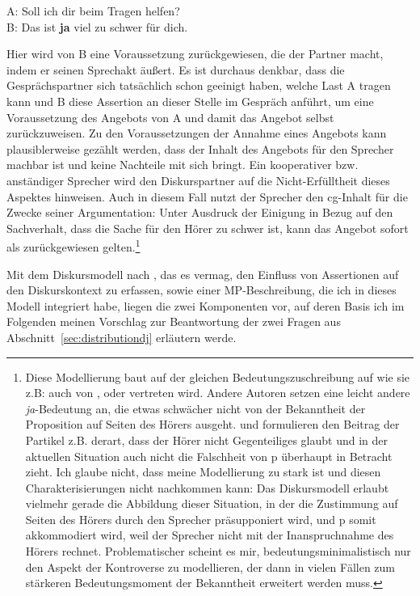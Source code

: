 \begin{exe}
	\ex\label{440} 
	A: Soll ich dir beim Tragen helfen?\\
	B: Das ist \textbf{ja} viel zu schwer für dich.
	\hfill\hbox {\citet[141]{Dahl1988}}
\end{exe}
Hier wird von B eine Voraussetzung zurückgewiesen, die der Partner macht, indem er seinen Sprechakt äußert. Es ist durchaus denkbar, dass die Gesprächspartner sich tatsächlich schon geeinigt haben, welche Last A tragen kann und B diese Assertion an dieser Stelle im Gespräch anführt, um eine Voraussetzung des Angebots von A und damit das Angebot selbst zurückzuweisen. Zu den Voraussetzungen der Annahme eines Angebots kann plausiblerweise gezählt werden, dass der Inhalt des Angebots für den Sprecher machbar ist und keine Nachteile mit sich bringt. Ein kooperativer bzw. anständiger Sprecher wird den Diskurspartner auf die Nicht-Erfülltheit dieses Aspektes hinweisen. Auch in diesem Fall nutzt der Sprecher den cg-Inhalt für die Zwecke seiner Argumentation: Unter Ausdruck der Einigung in Bezug auf den Sachverhalt, dass die Sache für den Hörer zu schwer ist, kann das Angebot sofort als zurückgewiesen gelten.\footnote{Diese Modellierung baut auf der gleichen Bedeutungszuschreibung auf wie sie z.B: auch von \citet[101]{Doherty1987}, \citet[104]{Thurmair1989} oder \citet[425]{Rinas2007} vertreten wird. Andere Autoren setzen eine leicht andere \textit{ja}-Bedeutung an, die etwas schwächer nicht von der Bekannt\-heit der Proposition auf Seiten des Hörers ausgeht. \citet[146]{Jacobs1991} und \citet[178]{Lindner1991} formulieren den Beitrag der Partikel z.B. derart, dass der Hörer nicht Gegenteiliges glaubt und in der aktuellen Situation auch nicht die Falschheit von p überhaupt in Betracht zieht. Ich glaube nicht, dass meine Modellierung zu stark ist und diesen Charakterisierungen nicht nachkommen kann: Das Diskursmodell erlaubt vielmehr gerade die Abbildung dieser Situation, in der die Zustimmung auf Seiten des Hörers durch den Sprecher präsupponiert wird, und p somit akkommodiert  wird, weil der Sprecher nicht mit der Inanspruchnahme des Hö\-rers rechnet. Problematischer scheint es mir, bedeutungsminimalistisch nur den Aspekt der Kontroverse zu modellieren, der dann in vielen Fällen zum stärkeren Bedeutungsmoment der Bekanntheit erweitert werden muss.}

Mit dem Diskursmodell nach \citet{Farkas2010}, das es vermag, den Einfluss von Assertionen auf den Diskurskontext zu erfassen, sowie einer MP-Beschrei\-bung, die ich in dieses Modell integriert habe, liegen die zwei Komponenten vor, auf deren Basis ich im Folgenden meinen Vorschlag zur Beantwortung der zwei Fragen aus Abschnitt~\ref{sec:distributiondj} erläutern werde.

